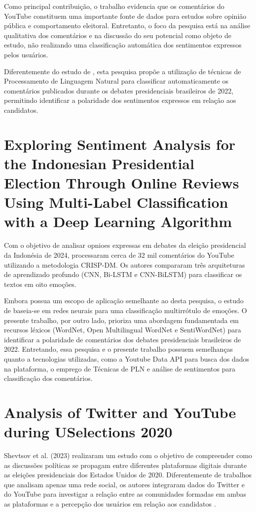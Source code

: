 \documentclass[
	12pt,				%
	openright,			%
	oneside,			%
	a4paper,			%
	english,			%
	brazil				%
	]{abntex2}
\begin{document}
Como principal contribuição, o trabalho evidencia que os comentários do YouTube constituem uma importante fonte de dados para estudos sobre opinião pública e comportamento eleitoral. Entretanto, o foco da pesquisa está na análise qualitativa dos comentários e na discussão do seu potencial como objeto de estudo, não realizando uma classificação automática dos sentimentos expressos pelos usuários.

Diferentemente do estudo de \cite{Eaton2024}, esta pesquisa propõe a utilização de técnicas de Processamento de Linguagem Natural para classificar automaticamente os comentários publicados durante os debates presidenciais brasileiros de 2022, permitindo identificar a polaridade dos sentimentos expressos em relação aos candidatos.

\section{Exploring Sentiment Analysis for the Indonesian Presidential Election Through Online Reviews Using Multi-Label Classification with a Deep Learning Algorithm}

Com o objetivo de analisar opnioes expressas em debates da eleição presidencial da Indonésia de 2024, \cite{info15110705} processaram cerca de 32 mil comentários do YouTube utilizando a metodologia CRISP-DM. Os autores compararam três arquiteturas de aprendizado profundo (CNN, Bi-LSTM e CNN-BiLSTM) para classificar os textos em oito emoções.

Embora possua um escopo de aplicação semelhante ao desta pesquisa, o estudo de \cite{info15110705} baseia-se em redes neurais para uma classificação multirrótulo de emoções. O presente trabalho, por outro lado, prioriza uma abordagem fundamentada em recursos léxicos (WordNet, Open Multilingual WordNet e SentiWordNet) para identificar a polaridade de comentários dos debates presidenciais brasileiros de 2022. Entretando, essa pesquisa e o presente trabalho possuem semelhanças quanto a tecnologias utilizadas, como a Youtube Data API para busca dos dados na plataforma, o emprego de Técnicas de PLN e análise de sentimentos para classificação dos comentários.

\section{Analysis of Twitter and YouTube during USelections 2020}

Shevtsov et al. (2023) realizaram um estudo com o objetivo de compreender como as discussões políticas se propagam entre diferentes plataformas digitais durante as eleições presidenciais dos Estados Unidos de 2020. Diferentemente de trabalhos que analisam apenas uma rede social, os autores integraram dados do Twitter e do YouTube para investigar a relação entre as comunidades formadas em ambas as plataformas e a percepção dos usuários em relação aos candidatos \cite{Shevtsov2023}.
\end{document}
